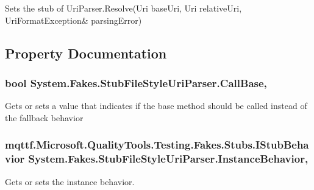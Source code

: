 Sets the stub of Uri\-Parser.\-Resolve(Uri base\-Uri, Uri relative\-Uri, Uri\-Format\-Exception\& parsing\-Error)



\subsection{Property Documentation}
\hypertarget{class_system_1_1_fakes_1_1_stub_file_style_uri_parser_a7adc589322c1be04a80e6ef761355bd3}{
\subsubsection[{Call\-Base}]{\setlength{\rightskip}{0pt plus 5cm}bool System.\-Fakes.\-Stub\-File\-Style\-Uri\-Parser.\-Call\-Base\hspace{0.3cm}{\ttfamily [get]}, {\ttfamily [set]}}}\label{class_system_1_1_fakes_1_1_stub_file_style_uri_parser_a7adc589322c1be04a80e6ef761355bd3}


Gets or sets a value that indicates if the base method should be called instead of the fallback behavior

\hypertarget{class_system_1_1_fakes_1_1_stub_file_style_uri_parser_a5045a8c3b72c68a4ad589817c6a3d19b}{
\subsubsection[{Instance\-Behavior}]{\setlength{\rightskip}{0pt plus 5cm}mqttf.\-Microsoft.\-Quality\-Tools.\-Testing.\-Fakes.\-Stubs.\-I\-Stub\-Behavior System.\-Fakes.\-Stub\-File\-Style\-Uri\-Parser.\-Instance\-Behavior\hspace{0.3cm}{\ttfamily [get]}, {\ttfamily [set]}}}\label{class_system_1_1_fakes_1_1_stub_file_style_uri_parser_a5045a8c3b72c68a4ad589817c6a3d19b}


Gets or sets the instance behavior.


